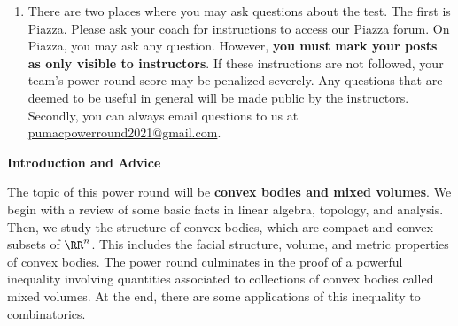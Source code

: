 \documentclass[11pt]{article}
\begin{document}
\begin{enumerate}
\item There are two places where you may ask questions about the test. The first is Piazza. Please ask your coach for instructions to access our Piazza forum. On Piazza, you may ask any question. However, \textbf{you must mark your posts as only visible to instructors}. If these instructions are not followed, your team's power round score may be penalized severely. Any questions that are deemed to be useful in general will be made public by the instructors. Secondly, you can always email questions to us at \href{mailto:pumacpowerround2021@gmail.com}{pumacpowerround2021@gmail.com}. 
\end{enumerate}

\newpage

\pagestyle{plain}
\LARGE{\textbf{Introduction and Advice}}

\vspace{.3cm}
\normalsize
The topic of this power round will be \textbf{convex bodies and mixed volumes}. We begin with a review of some basic facts in linear algebra, topology, and analysis. Then, we study the structure of convex bodies, which are compact and convex subsets of $\RR^n$. This includes the facial structure, volume, and metric properties of convex bodies. The power round culminates in the proof of a powerful inequality involving quantities associated to collections of convex bodies called mixed volumes. At the end, there are some applications of this inequality to combinatorics. 
\end{document}

